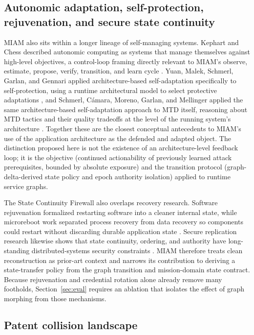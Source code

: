 \documentclass[11pt,letterpaper]{article}
\begin{document}
\subsection{Autonomic adaptation, self-protection, rejuvenation, and secure state continuity}

MIAM also sits within a longer lineage of self-managing systems. Kephart and Chess described autonomic computing as systems that manage themselves against high-level objectives, a control-loop framing directly relevant to MIAM's observe, estimate, propose, verify, transition, and learn cycle \cite{kephart2003}. Yuan, Malek, Schmerl, Garlan, and Gennari applied architecture-based self-adaptation specifically to self-protection, using a runtime architectural model to select protective adaptations \cite{yuan2013}, and Schmerl, C\'amara, Moreno, Garlan, and Mellinger applied the same architecture-based self-adaptation approach to MTD itself, reasoning about MTD tactics and their quality tradeoffs at the level of the running system's architecture \cite{schmerl2014}. Together these are the closest conceptual antecedents to MIAM's use of the application architecture as the defended and adapted object. The distinction proposed here is not the existence of an architecture-level feedback loop; it is the objective (continued actionability of previously learned attack prerequisites, bounded by absolute exposure) and the transition protocol (graph-delta-derived state policy and epoch authority isolation) applied to runtime service graphs.

The State Continuity Firewall also overlaps recovery research. Software rejuvenation formalized restarting software into a cleaner internal state, while microreboot work separated process recovery from data recovery so components could restart without discarding durable application state \cite{huang1995,candea2004}. Secure replication research likewise shows that state continuity, ordering, and authority have long-standing distributed-systems security constraints \cite{reiter1994}. MIAM therefore treats clean reconstruction as prior-art context and narrows its contribution to deriving a state-transfer policy from the graph transition and mission-domain state contract. Because rejuvenation and credential rotation alone already remove many footholds, Section~\ref{sec:eval} requires an ablation that isolates the effect of graph morphing from those mechanisms.

\subsection{Patent collision landscape}
\end{document}
